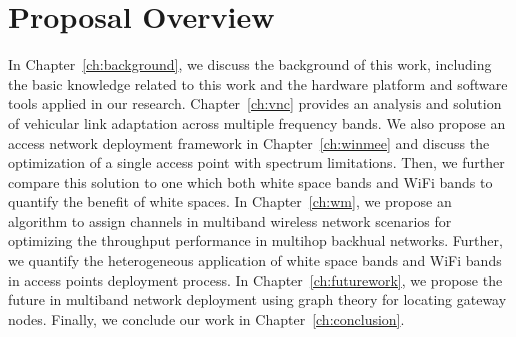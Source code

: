 \section{Proposal Overview}

In Chapter~\ref{ch:background}, we discuss the background of this work, 
including the basic knowledge related to this work and the hardware 
platform and software tools applied in our research. Chapter~\ref{ch:vnc} 
provides an analysis and solution of vehicular link adaptation across multiple frequency bands. 
We also propose an access network deployment 
framework in Chapter~\ref{ch:winmee} and discuss the optimization of a 
single access point with spectrum limitations. Then, we further
compare this solution to one which both white space bands and WiFi 
bands to quantify the benefit of white spaces. In Chapter~\ref{ch:wm}, we propose an 
algorithm to assign channels in multiband wireless network scenarios for 
optimizing the throughput performance in multihop backhual networks. Further, we 
quantify the heterogeneous application of white space bands and WiFi bands 
in access points deployment process. In Chapter~\ref{ch:futurework}, we 
propose the future in multiband network deployment using graph theory for locating
gateway nodes. 
Finally, we conclude our work in Chapter~\ref{ch:conclusion}.

